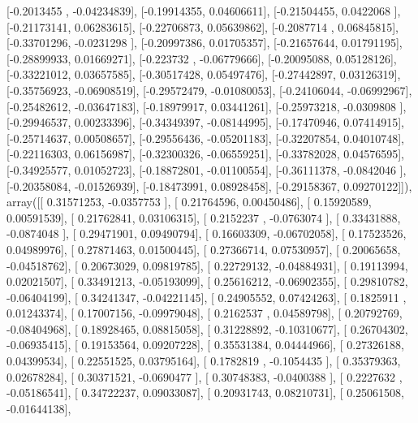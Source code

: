 \documentclass{article}
\begin{document}
       [-0.2013455 , -0.04234839],
       [-0.19914355,  0.04606611],
       [-0.21504455,  0.0422068 ],
       [-0.21173141,  0.06283615],
       [-0.22706873,  0.05639862],
       [-0.2087714 ,  0.06845815],
       [-0.33701296, -0.0231298 ],
       [-0.20997386,  0.01705357],
       [-0.21657644,  0.01791195],
       [-0.28899933,  0.01669271],
       [-0.223732  , -0.06779666],
       [-0.20095088,  0.05128126],
       [-0.33221012,  0.03657585],
       [-0.30517428,  0.05497476],
       [-0.27442897,  0.03126319],
       [-0.35756923, -0.06908519],
       [-0.29572479, -0.01080053],
       [-0.24106044, -0.06992967],
       [-0.25482612, -0.03647183],
       [-0.18979917,  0.03441261],
       [-0.25973218, -0.0309808 ],
       [-0.29946537,  0.00233396],
       [-0.34349397, -0.08144995],
       [-0.17470946,  0.07414915],
       [-0.25714637,  0.00508657],
       [-0.29556436, -0.05201183],
       [-0.32207854,  0.04010748],
       [-0.22116303,  0.06156987],
       [-0.32300326, -0.06559251],
       [-0.33782028,  0.04576595],
       [-0.34925577,  0.01052723],
       [-0.18872801, -0.01100554],
       [-0.36111378, -0.0842046 ],
       [-0.20358084, -0.01526939],
       [-0.18473991,  0.08928458],
       [-0.29158367,  0.09270122]]), array([[ 0.31571253, -0.0357753 ],
       [ 0.21764596,  0.00450486],
       [ 0.15920589,  0.00591539],
       [ 0.21762841,  0.03106315],
       [ 0.2152237 , -0.0763074 ],
       [ 0.33431888, -0.0874048 ],
       [ 0.29471901,  0.09490794],
       [ 0.16603309, -0.06702058],
       [ 0.17523526,  0.04989976],
       [ 0.27871463,  0.01500445],
       [ 0.27366714,  0.07530957],
       [ 0.20065658, -0.04518762],
       [ 0.20673029,  0.09819785],
       [ 0.22729132, -0.04884931],
       [ 0.19113994,  0.02021507],
       [ 0.33491213, -0.05193099],
       [ 0.25616212, -0.06902355],
       [ 0.29810782, -0.06404199],
       [ 0.34241347, -0.04221145],
       [ 0.24905552,  0.07424263],
       [ 0.1825911 ,  0.01243374],
       [ 0.17007156, -0.09979048],
       [ 0.2162537 ,  0.04589798],
       [ 0.20792769, -0.08404968],
       [ 0.18928465,  0.08815058],
       [ 0.31228892, -0.10310677],
       [ 0.26704302, -0.06935415],
       [ 0.19153564,  0.09207228],
       [ 0.35531384,  0.04444966],
       [ 0.27326188,  0.04399534],
       [ 0.22551525,  0.03795164],
       [ 0.1782819 , -0.1054435 ],
       [ 0.35379363,  0.02678284],
       [ 0.30371521, -0.0690477 ],
       [ 0.30748383, -0.0400388 ],
       [ 0.2227632 , -0.05186541],
       [ 0.34722237,  0.09033087],
       [ 0.20931743,  0.08210731],
       [ 0.25061508, -0.01644138],
\end{document}
